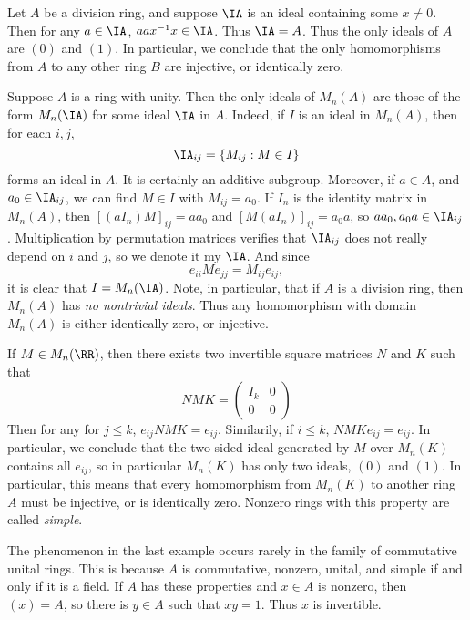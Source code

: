 \begin{example}
    Let $A$ be a division ring, and suppose $\IA$ is an ideal containing some $x \neq 0$. Then for any $a \in \IA$, $a ax^{-1}x \in \IA$. Thus $\IA = A$. Thus the only ideals of $A$ are $(0)$ and $(1)$. In particular, we conclude that the only homomorphisms from $A$ to any other ring $B$ are injective, or identically zero.
\end{example}

\begin{example}
    Suppose $A$ is a ring with unity. Then the only ideals of $M_n(A)$ are those of the form $M_n(\IA)$ for some ideal $\IA$ in $A$. Indeed, if $I$ is an ideal in $M_n(A)$, then for each $i,j$,
    \[ \IA_{ij} = \{ M_{ij} : M \in I \} \]
    forms an ideal in $A$. It is certainly an additive subgroup. Moreover, if $a \in A$, and $a_0 \in \IA_{ij}$, we can find $M \in I$ with $M_{ij} = a_0$. If $I_n$ is the identity matrix in $M_n(A)$, then $[(aI_n)M]_{ij} = aa_0$ and $[M(aI_n)]_{ij} = a_0a$, so $aa_0, a_0a \in \IA_{ij}$. Multiplication by permutation matrices verifies that $\IA_{ij}$ does not really depend on $i$ and $j$, so we denote it my $\IA$. And since
    \[ e_{ii}Me_{jj} = M_{ij} e_{ij}, \]
    it is clear that $I = M_n(\IA)$. Note, in particular, that if $A$ is a division ring, then $M_n(A)$ has \emph{no nontrivial ideals}. Thus any homomorphism with domain $M_n(A)$ is either identically zero, or injective.
\end{example}

\begin{example}
    If $M \in M_n(\RR)$, then there exists two invertible square matrices $N$ and $K$ such that
    \[  NMK = \begin{pmatrix} I_k & 0 \\ 0 & 0 \end{pmatrix} \]
    Then for any for $j \leq k$, $e_{ij} NMK = e_{ij}$. Similarily, if $i \leq k$, $NMKe_{ij} = e_{ij}$. In particular, we conclude that the two sided ideal generated by $M$ over $M_n(K)$ contains all $e_{ij}$, so in particular $M_n(K)$ has only two ideals, $(0)$ and $(1)$. In particular, this means that every homomorphism from $M_n(K)$ to another ring $A$ must be injective, or is identically zero. Nonzero rings with this property are called \emph{simple}.
\end{example}

The phenomenon in the last example occurs rarely in the family of commutative unital rings. This is because $A$ is commutative, nonzero, unital, and simple if and only if it is a field. If $A$ has these properties and $x \in A$ is nonzero, then $(x) = A$, so there is $y \in A$ such that $xy = 1$. Thus $x$ is invertible.

